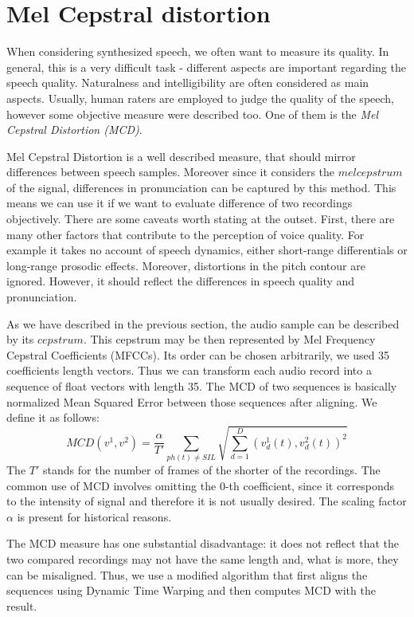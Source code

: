 \section{Mel Cepstral distortion}
\label{MCD-desc}
When considering synthesized speech, we often want to measure its quality.
In general, this is a very difficult task - different aspects are important regarding the speech quality.
Naturalness and intelligibility are often considered as main aspects.
Usually, human raters are employed to judge the quality of the speech, however some objective measure were described too.
One of them is the \textit{Mel Cepstral Distortion (MCD)}.
\par
Mel Cepstral Distortion \cite{kubichek1993mel} is a well described measure, that should mirror differences between speech samples.
Moreover since it considers the $mel cepstrum$ of the signal, differences in pronunciation can be captured by this method.
This means we can use it if we want to evaluate difference of two recordings objectively.
There are some caveats worth stating at the outset.
First, there are many other factors that contribute to the perception of voice quality.
For example it takes no account of speech dynamics, either short-range differentials or long-range prosodic effects.
Moreover, distortions in the pitch contour are ignored.
However, it should reflect the differences in speech quality and pronunciation.
\par
As we have described in the previous section, the audio sample can be described by its $cepstrum$.
This cepstrum may be then represented by Mel Frequency Cepstral Coefficients (MFCCs). Its order can be chosen arbitrarily, we used 35 coefficients length vectors. Thus we can transform each audio record into a sequence of float vectors with length 35. The MCD \cite{kubichek1993mel} of two sequences is basically normalized Mean Squared Error between those sequences after aligning. We define it as follows:
\begin{equation}
MCD(v^1, v^2) = \frac{\alpha}{T'}\sum_{ph(t) \neq SIL}\sqrt{\sum_{d=1}^{D}(v_d^1(t), v_d^2(t))^2}
\end{equation}
The $T'$ stands for the number of frames of the shorter of the recordings.
The common use of MCD involves omitting the $0$-th coefficient, since it corresponds to the intensity of signal and therefore it is not usually desired.
The scaling factor $\alpha$ is present for historical reasons.
\par
The MCD measure has one substantial disadvantage: it does not reflect that the two compared recordings may not have the same length and, what is more, they can be misaligned.
Thus, we use a modified algorithm that first aligns the sequences using Dynamic Time Warping and then computes MCD with the result.
